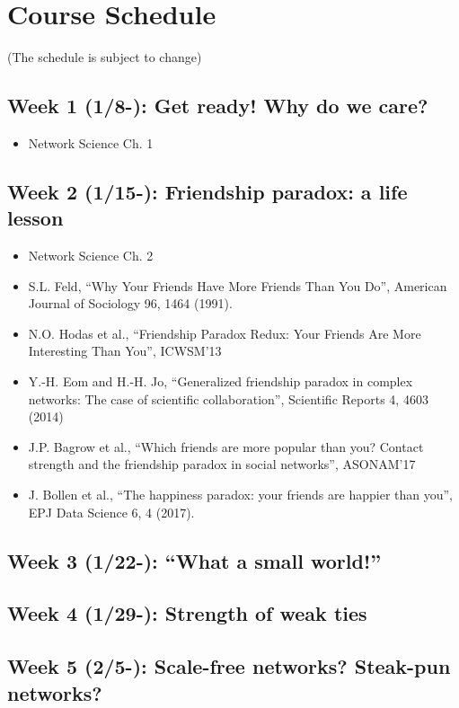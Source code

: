 \documentclass[11pt,article,oneside]{memoir} %
\begin{document}
\section{Course Schedule} %

(The schedule is subject to change)

\subsection{Week 1 (1/8-):  Get ready! Why do we care?}
\vspace{-0.2em}\begin{itemize}\itemsep0em
\item Network Science Ch. 1
\end{itemize}
\subsection{Week 2 (1/15-):  Friendship paradox: a life lesson}
\vspace{-0.2em}\begin{itemize}\itemsep0em
\item Network Science Ch. 2
\item S.L. Feld, ``Why Your Friends Have More Friends Than You Do'', American Journal of Sociology 96, 1464 (1991).
\item N.O. Hodas et al., ``Friendship Paradox Redux: Your Friends Are More Interesting Than You'', ICWSM'13
\item Y.-H. Eom and H.-H. Jo, ``Generalized friendship paradox in complex networks: The case of scientific collaboration'', Scientific Reports 4, 4603 (2014)
\item J.P. Bagrow et al., ``Which friends are more popular than you? Contact strength and the friendship paradox in social networks'', ASONAM'17
\item J. Bollen et al., ``The happiness paradox: your friends are happier than you'', EPJ Data Science 6, 4 (2017).
\end{itemize}
\subsection{Week 3 (1/22-):  ``What a small world!''}
\subsection{Week 4 (1/29-):  Strength of weak ties}
\subsection{Week 5 (2/5-):  Scale-free networks? Steak-pun networks?}
\end{document}
